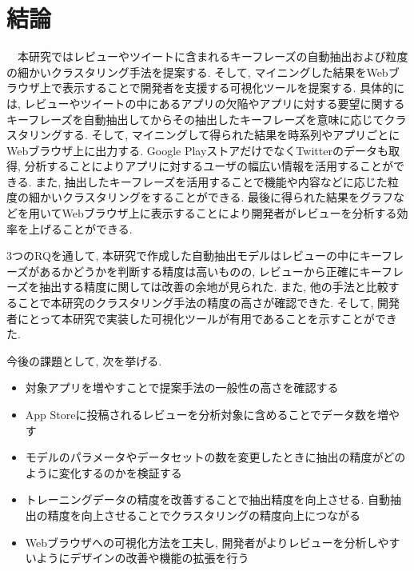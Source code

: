 \chapter{結論}
\label{chap:keturon}

　本研究ではレビューやツイートに含まれるキーフレーズの自動抽出および粒度の細かいクラスタリング手法を提案する. そして, マイニングした結果をWebブラウザ上で表示することで開発者を支援する可視化ツールを提案する. 
具体的には, レビューやツイートの中にあるアプリの欠陥やアプリに対する要望に関するキーフレーズを自動抽出してからその抽出したキーフレーズを意味に応じてクラスタリングする.  そして, マイニングして得られた結果を時系列やアプリごとにWebブラウザ上に出力する.
Google PlayストアだけでなくTwitterのデータも取得, 分析することによりアプリに対するユーザの幅広い情報を活用することができる. また, 抽出したキーフレーズを活用することで機能や内容などに応じた粒度の細かいクラスタリングをすることができる. 最後に得られた結果をグラフなどを用いてWebブラウザ上に表示することにより開発者がレビューを分析する効率を上げることができる. 

3つのRQを通して, 本研究で作成した自動抽出モデルはレビューの中にキーフレーズがあるかどうかを判断する精度は高いものの, レビューから正確にキーフレーズを抽出する精度に関しては改善の余地が見られた. また, 他の手法と比較することで本研究のクラスタリング手法の精度の高さが確認できた. そして, 開発者にとって本研究で実装した可視化ツールが有用であることを示すことができた. 

今後の課題として, 次を挙げる. 

\begin{itemize}
    \item 対象アプリを増やすことで提案手法の一般性の高さを確認する
    \item App Storeに投稿されるレビューを分析対象に含めることでデータ数を増やす
    \item モデルのパラメータやデータセットの数を変更したときに抽出の精度がどのように変化するのかを検証する
    \item トレーニングデータの精度を改善することで抽出精度を向上させる. 自動抽出の精度を向上させることでクラスタリングの精度向上につながる
    \item Webブラウザへの可視化方法を工夫し, 開発者がよりレビューを分析しやすいようにデザインの改善や機能の拡張を行う
\end{itemize}
